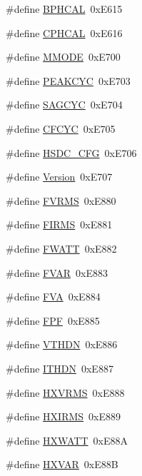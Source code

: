 \begin{DoxyCompactItemize}
\#define \hyperlink{a00036_a06542705c13e1acd769b69a990e95594}{B\-P\-H\-C\-A\-L}~0x\-E615
\item 
\#define \hyperlink{a00036_a5da995ba3336521304ed284d12177ca9}{C\-P\-H\-C\-A\-L}~0x\-E616
\item 
\#define \hyperlink{a00036_a0f139512fb7be680a27b2bbc3333efe8}{M\-M\-O\-D\-E}~0x\-E700
\item 
\#define \hyperlink{a00036_aab38f75e935804d90a60ddee3bb96962}{P\-E\-A\-K\-C\-Y\-C}~0x\-E703
\item 
\#define \hyperlink{a00036_aa315ec13f75dbeb156b2222f99cea0f0}{S\-A\-G\-C\-Y\-C}~0x\-E704
\item 
\#define \hyperlink{a00036_a60015970f15346193913f4b20e78ab83}{C\-F\-C\-Y\-C}~0x\-E705
\item 
\#define \hyperlink{a00036_a1ef9153bd21f7ed65a6471842212e435}{H\-S\-D\-C\-\_\-\-C\-F\-G}~0x\-E706
\item 
\#define \hyperlink{a00036_a00c9dad6cd91a4abb6062ea1efc82bd9}{Version}~0x\-E707
\item 
\#define \hyperlink{a00036_ae580fd9f9739589e08315bff869b16cf}{F\-V\-R\-M\-S}~0x\-E880
\item 
\#define \hyperlink{a00036_a58ba8cc4291577f8ba6c6fec4408242a}{F\-I\-R\-M\-S}~0x\-E881
\item 
\#define \hyperlink{a00036_a002eccf714bbac8b4e8953f4be2efef4}{F\-W\-A\-T\-T}~0x\-E882
\item 
\#define \hyperlink{a00036_a57335a9934a3428994476326141589ed}{F\-V\-A\-R}~0x\-E883
\item 
\#define \hyperlink{a00036_a2c02e499fcc895be334b284c7d928a0c}{F\-V\-A}~0x\-E884
\item 
\#define \hyperlink{a00036_a703b4f81abadf5e673e21656cedb1bdc}{F\-P\-F}~0x\-E885
\item 
\#define \hyperlink{a00036_af4bad23826b54772e2de561c5cff3fa6}{V\-T\-H\-D\-N}~0x\-E886
\item 
\#define \hyperlink{a00036_af451e4358c635504ffb96127fb87b003}{I\-T\-H\-D\-N}~0x\-E887
\item 
\#define \hyperlink{a00036_a0fc103a0748d8aa916c859108574913a}{H\-X\-V\-R\-M\-S}~0x\-E888
\item 
\#define \hyperlink{a00036_a46e6200d5a1ec07a23be9dfce8ac7f60}{H\-X\-I\-R\-M\-S}~0x\-E889
\item 
\#define \hyperlink{a00036_a41b00ce2b5d9729f5783c2bf4ad50b35}{H\-X\-W\-A\-T\-T}~0x\-E88\-A
\item 
\#define \hyperlink{a00036_ab41bd850709b7c4ffd94d5933e850df7}{H\-X\-V\-A\-R}~0x\-E88\-B

\end{DoxyCompactItemize}

